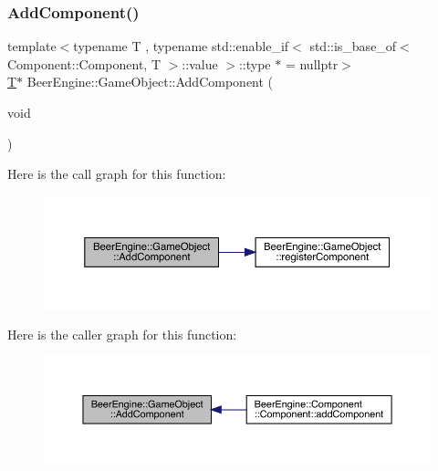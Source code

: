 \subsubsection{\texorpdfstring{Add\+Component()}{AddComponent()}}
{\footnotesize\ttfamily template$<$typename T , typename std\+::enable\+\_\+if$<$ std\+::is\+\_\+base\+\_\+of$<$ Component\+::\+Component, T $>$\+::value $>$\+::type $\ast$  = nullptr$>$ \\
\mbox{\hyperlink{namespace_beer_engine_a94f0b552f6dc910de8cdb44207981f53a8de48e594408f9fc561b2f68ce05f664}{T}}$\ast$ Beer\+Engine\+::\+Game\+Object\+::\+Add\+Component (\begin{DoxyParamCaption}\item[{void}]{ }\end{DoxyParamCaption})\hspace{0.3cm}{\ttfamily [inline]}}

Here is the call graph for this function\+:
\nopagebreak
\begin{figure}[H]
\begin{center}
\leavevmode
\includegraphics[width=350pt]{class_beer_engine_1_1_game_object_a62e1af180bc3c2cd12c06153ac06aa3a_cgraph}
\end{center}
\end{figure}
Here is the caller graph for this function\+:
\nopagebreak
\begin{figure}[H]
\begin{center}
\leavevmode
\includegraphics[width=350pt]{class_beer_engine_1_1_game_object_a62e1af180bc3c2cd12c06153ac06aa3a_icgraph}
\end{center}
\end{figure}
\mbox{\label{class_beer_engine_1_1_game_object_a50b9ea3bbd7fa155f5ab4b4b1da52b7a}} 
